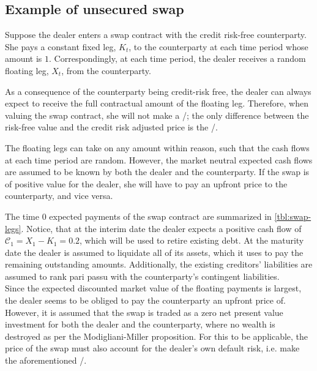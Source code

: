 \documentclass[main.tex]{subfiles}
\begin{document}
        \subsection{Example of unsecured swap}
            Suppose the dealer enters a swap contract with the credit risk-free counterparty.
            She pays a constant fixed leg, $K_t$, to the counterparty at each time period whose amount is $\num{1}$.
            Correspondingly, at each time period,
            the dealer receives a random floating leg, $X_t$, from the counterparty.

            As a consequence of the counterparty being credit-risk free,
            the dealer can always expect to receive the full contractual amount of the floating leg.
            Therefore, when valuing the swap contract,
            she will not make a \CVA/; 
            the only difference between the risk-free value and the credit risk adjusted price is the \DVA/.

            The floating legs can take on any amount within reason,
            such that the cash flows at each time period are random.
            However, the market neutral expected cash flows are assumed to be known
            by both the dealer and the counterparty.
            If the swap is of positive value for the dealer,
            she will have to pay an upfront price to the counterparty,
            and vice versa.

            The time 0 expected payments of the swap contract are summarized in \cref{tbl:swap-legs}.
            Notice, that at the interim date the dealer expects a positive cash flow of
            $\mathcal{C}_1 = X_1 - K_1 = \num{0.2}$,
            which will be used to retire existing debt.
            At the maturity date the dealer is assumed to liquidate all of its assets,
            which it uses to pay the remaining outstanding amounts.
            Additionally, the existing creditors' liabilities are assumed to rank pari passu with the counterparty's contingent liabilities.
            \\
            Since the expected discounted market value of the floating payments is largest,
            the dealer seems to be obliged to pay the counterparty an upfront price of.
            However, it is assumed that the swap is traded as a zero net present value investment
            for both the dealer and the counterparty,
            where no wealth is destroyed as per the Modigliani-Miller proposition.
            For this to be applicable, the price of the swap must also account for the dealer's own default risk,
            i.e. make the aforementioned \DVA/.
            
\end{document}
